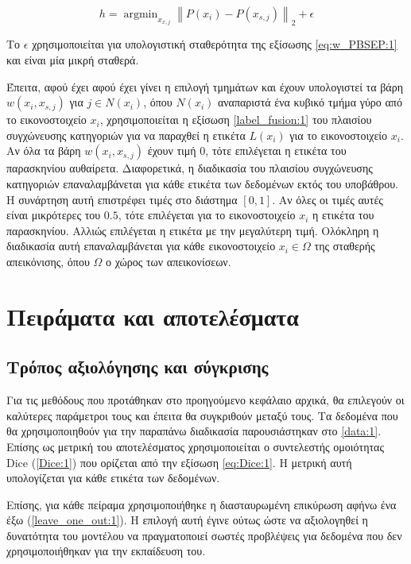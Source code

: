 \documentclass[a4paper,12pt]{article}
\newcommand{\argminB}{\mathop{\mathrm{argmin}}}
\newcommand\norm[1]{\left\lVert#1\right\rVert}
\begin{document}
\begin{equation*} 
    h = \argminB_{x_{x,j}} \norm{P(x_i) - P(x_{s,j})}_2 + \epsilon
\end{equation*}

Το $\epsilon$ χρησιμοποιείται για υπολογιστική σταθερότητα της εξίσωσης
\eqref{eq:w_PBSEP:1} και είναι μία μικρή σταθερά.

Έπειτα, αφού έχει αφού έχει γίνει η επιλογή τμημάτων και έχουν υπολογιστεί τα
βάρη $w(x_i, x_{s,j})$ για $j \in N(x_i)$, όπου $N(x_i)$ αναπαριστά ένα κυβικό
τμήμα γύρο από το εικονοστοιχείο $x_i$, χρησιμοποιείται η εξίσωση
\eqref{label_fusion:1} του πλαισίου συγχώνευσης κατηγοριών για να παραχθεί η
ετικέτα $L(x_i)$ για το εικονοστοιχείο $x_i$. Αν όλα τα βάρη $w(x_i, x_{s,j})$
έχουν τιμή $0$, τότε επιλέγεται η ετικέτα του παρασκηνίου αυθαίρετα.
Διαφορετικά, η διαδικασία του πλαισίου συγχώνευσης κατηγοριών επαναλαμβάνεται
για κάθε ετικέτα των δεδομένων εκτός του υποβάθρου. Η συνάρτηση αυτή επιστρέφει
τιμές στο διάστημα $[0,1]$. Αν όλες οι τιμές αυτές είναι μικρότερες του $0.5$,
τότε επιλέγεται για το εικονοστοιχείο $x_i$ η ετικέτα του παρασκηνίου. Αλλιώς
επιλέγεται η ετικέτα με την μεγαλύτερη τιμή. Ολόκληρη η διαδικασία αυτή
επαναλαμβάνεται για κάθε εικονοστοιχείο $x_i \in \Omega$ της σταθερής
απεικόνισης, όπου $\Omega$ ο χώρος των απεικονίσεων.


\section{Πειράματα και αποτελέσματα}

\subsection{Τρόπος αξιολόγησης και σύγκρισης}

Για τις μεθόδους που προτάθηκαν στο προηγούμενο κεφάλαιο αρχικά, θα επιλεγούν οι
καλύτερες παράμετροι τους και έπειτα θα συγκριθούν μεταξύ τους. Τα δεδομένα που
θα χρησιμοποιηθούν για την παραπάνω διαδικασία παρουσιάστηκαν στο \ref{data:1}.
Επίσης ως μετρική του αποτελέσματος χρησιμοποιείται ο συντελεστής ομοιότητας
Dice (\ref{Dice:1}) που ορίζεται από την εξίσωση \eqref{eq:Dice:1}. Η μετρική
αυτή υπολογίζεται για κάθε ετικέτα των δεδομένων.

Επίσης, για κάθε πείραμα χρησιμοποιήθηκε η διασταυρωμένη επικύρωση αφήνω ένα έξω
(\ref{leave_one_out:1}). Η επιλογή αυτή έγινε ούτως ώστε να αξιολογηθεί η
δυνατότητα του μοντέλου να πραγματοποιεί σωστές προβλέψεις για δεδομένα που δεν
χρησιμοποιήθηκαν για την εκπαίδευση του.
\end{document}
